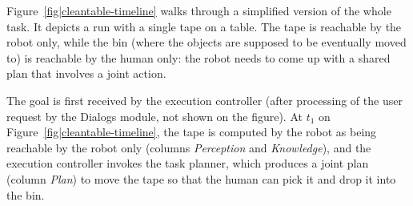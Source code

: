 \documentclass[preprint,3p,times]{elsarticle}
\newcommand{\action}[3]{#1\\\textsf{\scriptsize #2,}\\\textsf{\scriptsize #3}}
\begin{document}
%
%
%
%
%
%
%
%
%
%
%

Figure~\ref{fig|cleantable-timeline} walks through a simplified version of the whole
task. It depicts a run with a single tape on a table. The tape is
reachable by the robot only, while the bin (where the objects are supposed to be
eventually moved to) is reachable by the human only: the robot needs to come up
with a shared plan that involves a joint action.

The goal is first received by the execution controller (after processing of the
user request by the {\sc Dialogs} module, not shown on the figure). At $t_1$ on
Figure~\ref{fig|cleantable-timeline}, the tape is computed by the robot as being
reachable by the robot only (columns \emph{Perception} and \emph{Knowledge}),
and the execution controller invokes the task planner, which produces a joint
plan (column \emph{Plan}) to move the tape so that the human can pick it and
drop it into the bin.
\end{document}
